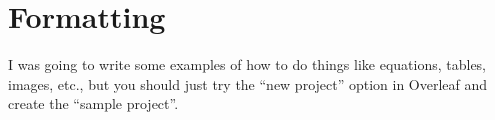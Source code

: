 \section{Formatting}

I was going to write some examples of how to do things like
equations, tables, images, etc., but you should just try
the ``new project'' option in Overleaf and create the ``sample project''.

